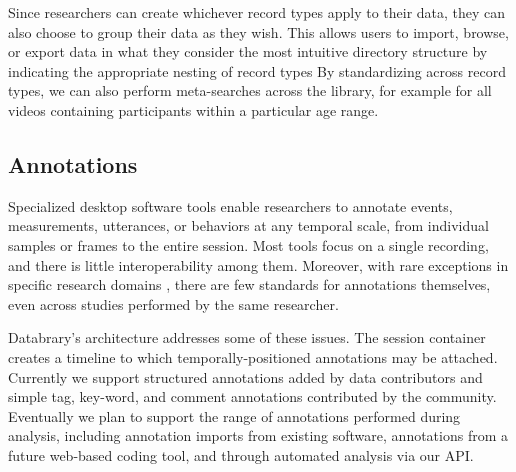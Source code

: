 \documentclass{sig-alternate}
\begin{document}
Since researchers can create whichever record types apply to their data, they can also choose to group their data as they wish.
This allows users to import, browse, or export data in what they consider the most intuitive directory structure by indicating the appropriate nesting of record types
By standardizing across record types, we can also perform meta-searches across the library, for example for all videos containing participants within a particular age range.

\subsection{Annotations}

Specialized desktop software tools enable researchers to annotate events, measurements, utterances, or behaviors at any temporal scale, from individual samples or frames to the entire session.
Most tools focus on a single recording, and there is little interoperability among them.
Moreover, with rare exceptions in specific research domains \cite{MacWhinney2001}, there are few standards for annotations themselves, even across studies performed by the same researcher.

Databrary's architecture addresses some of these issues. The session container creates a timeline to which temporally-positioned annotations may be attached. 
Currently we support structured annotations added by data contributors and simple tag, key-word, and comment annotations contributed by the community.
Eventually we plan to support the range of annotations performed during analysis, including annotation imports from existing software, annotations from a future web-based coding tool, and through automated analysis via our API.

\end{document}
